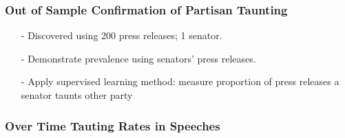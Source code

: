 \documentclass{beamer}
\numberwithin{equation}{section}
\begin{document}
\begin{frame}
\frametitle{Out of Sample Confirmation of Partisan Taunting}
\begin{itemize}
\item[-] Discovered using 200 press releases; 1 senator.
\item[-] Demonstrate prevalence using senators' press releases. 
\item[-] Apply supervised learning method: measure \alert{proportion of press releases} a senator
taunts other party
\end{itemize}
 \pause
{}
\end{frame}

\begin{frame}
\frametitle{Over Time Tauting Rates in Speeches}

\begin{figure}[hbt!]
      \begin{center}
      \end{center}
     \end{figure}
      
 \end{frame}
\end{document}
